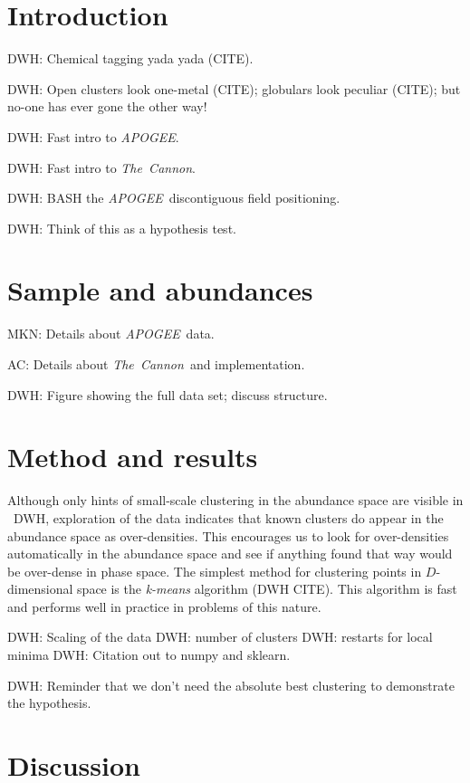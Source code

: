 \documentclass[12pt, letterpaper, preprint]{aastex}
\newcommand{\acronym}[1]{{\small{#1}}}
\newcommand{\project}[1]{\textsl{#1}}
\newcommand{\apogee}{\acronym{\project{APOGEE}}}
\newcommand{\thecannon}{\project{The~Cannon}}
\begin{document}
\section{Introduction}

DWH: Chemical tagging yada yada (CITE).

DWH: Open clusters look one-metal (CITE); globulars look peculiar (CITE); but no-one has ever gone the other way! 

DWH: Fast intro to \apogee.

DWH: Fast intro to \thecannon.

DWH: BASH the \apogee\ discontiguous field positioning.

DWH: Think of this as a hypothesis test.

\section{Sample and abundances}

MKN: Details about \apogee\ data.

AC: Details about \thecannon\ and implementation.

DWH: Figure showing the full data set; discuss structure.

\section{Method and results}

Although only hints of small-scale clustering in the abundance space
are visible in \figurename~DWH, exploration of the data indicates that
known clusters do appear in the abundance space as over-densities.
This encourages us to look for over-densities automatically in the
abundance space and see if anything found that way would be over-dense
in phase space.
The simplest method for clustering points in $D$-dimensional space is
the \emph{k-means} algorithm (DWH CITE).
This algorithm is fast and performs well in practice in problems of
this nature.

DWH: Scaling of the data
DWH: number of clusters
DWH: restarts for local minima
DWH: Citation out to numpy and sklearn.

DWH: Reminder that we don't need the absolute best clustering to
demonstrate the hypothesis.

\section{Discussion}
\end{document}

